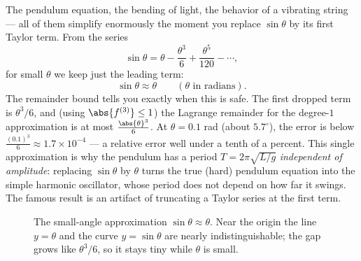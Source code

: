 The pendulum equation, the bending of light, the behavior of a vibrating string ---
all of them simplify enormously the moment you replace $\sin\theta$ by its first
Taylor term. From the series
\[
  \sin\theta = \theta - \frac{\theta^3}{6} + \frac{\theta^5}{120} - \cdots,
\]
for small $\theta$ we keep just the leading term:
\[
  \sin\theta \approx \theta \qquad (\theta \text{ in radians}).
\]
The remainder bound tells you exactly when this is safe. The first dropped term is
$\theta^3/6$, and (using $\abs{f^{(3)}} \le 1$) the Lagrange remainder for the
degree-$1$ approximation is at most $\frac{\abs{\theta}^3}{6}$. At
$\theta = 0.1$ rad (about $5.7^\circ$), the error is below
$\frac{(0.1)^3}{6} \approx 1.7\times 10^{-4}$ --- a relative error well under a tenth
of a percent. This single approximation is why the pendulum has a period
$T = 2\pi\sqrt{L/g}$ \emph{independent of amplitude}: replacing $\sin\theta$ by
$\theta$ turns the true (hard) pendulum equation into the simple harmonic oscillator,
whose period does not depend on how far it swings. The famous result is an artifact of
truncating a Taylor series at the first term.

\begin{figure}[H]
\centering
{}
\caption{The small-angle approximation $\sin\theta \approx \theta$. Near the origin
the line $y=\theta$ and the curve $y=\sin\theta$ are nearly indistinguishable; the gap
grows like $\theta^3/6$, so it stays tiny while $\theta$ is small.}
\label{ch31:fig-small-angle}
\end{figure}

